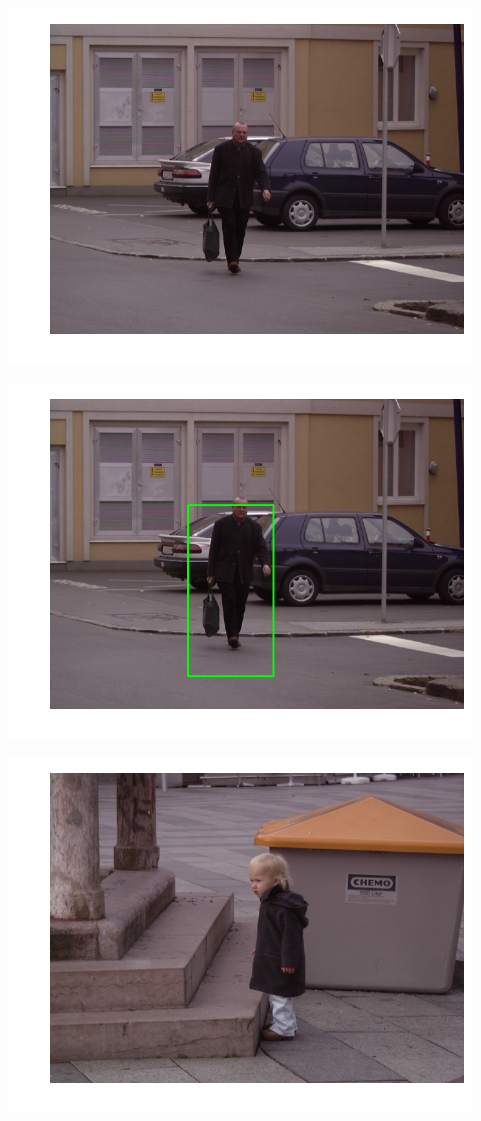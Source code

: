 \includegraphics{facedetection_files/facedetection_62_0.png}

\includegraphics{facedetection_files/facedetection_62_1.png}

\includegraphics{facedetection_files/facedetection_62_2.png}

